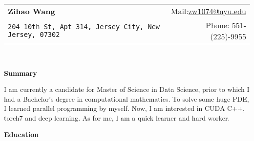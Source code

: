 \documentclass[a4paper,11pt]{article}
\renewcommand{\normalsize}{\fontsize{12pt}{\baselineskip}\selectfont}
\newcommand{\resheading}[1]{{\large \colorbox{mygrey}{\begin{minipage}{\textwidth}{\textbf{#1 \vphantom{p\^{E}}}}\end{minipage}}}}
\begin{document}
	\footnotesize
	\newcommand{\mywebheader}{
		\begin{tabular*}{7in}{l@{\extracolsep{\fill}}r}
			\textbf{\LARGE Zihao Wang} & Mail:\href{mailto:zw1074@nyu.edu}{zw1074@nyu.edu}\\
			{\footnotesize \texttt{204 10th St, Apt 314, Jersey City, New Jersey, 07302}
			}
			& Phone: 551-(225)-9955
		\end{tabular*}
		\\
		\vspace{0.1in}}
	
	\mywebheader
	
	\resheading{Summary}
	I am currently a candidate for Master of Science in Data Science, prior to which I had a Bachelor's degree in computational mathematics. To solve some huge PDE, I learned parallel programming by myself. Now, I am interested in CUDA C++, torch7 and deep learning. As for me, I am a quick learner and hard worker. 
	\resheading{Education}
\end{document}
